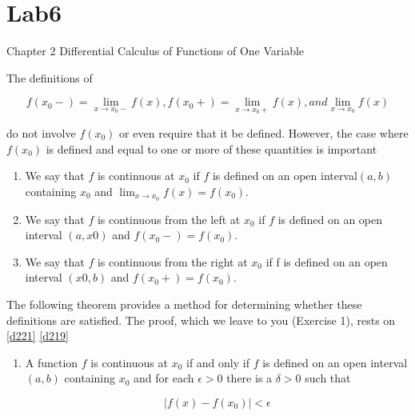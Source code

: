 \chapter{Lab6}
\begin{flushleft}

Chapter 2 Differential Calculus of Functions of One Variable

The definitions of

$$
f(x_0-) =  \lim_{x \rightarrow x_0-} f(x), f(x_0+) =  \lim_{x \rightarrow x_0+} f(x), and  \lim_{x \rightarrow x_0} f(x)
$$


do not involve $f(x_0)$ or even require that it be defined. However, the case where $f(x_0)$ is
defined and equal to one or more of these quantities is important

\begin{definition}\label{d219}


\begin{enumerate}[label=\alph*.]
\item  We say that $f$ is continuous at $x_0$ if $f$ is defined on an open interval$(a, b)$ containing
$x_0$ and $ \lim_{x \rightarrow x_0} f(x) = f(x_0).$

\item  We say that $f$ is continuous from the left at $x_0$ if $f$ is defined on an open interval
$(a, x0)$ and $f(x_0-) = f(x_0).$
\item  We say that $f$ is continuous from the right at $x_0$ if f is defined on an open interval
$(x0, b)$ and $f(x_0+) = f(x_0).$
\end{enumerate}
\end{definition}



The following theorem provides a method for determining whether these definitions are
satisfied. The proof, which we leave to you (Exercise 1), rests on \ref{d221} \ref{d219}


\begin{theorem}\label{t219}
\begin{enumerate}[label=\alph*.]
\item  A function $f$ is continuous at $x_0$ if and only if $f$ is defined on an open interval $(a, b)$
containing $x_0$ and for each $ \epsilon  > 0$ there is a $\delta  > 0$ such that




\begin{equation}\label{formula1}
| f(x) - f (x_0) | < \epsilon
\end{equation}


\end{enumerate}
\end{theorem}
\end{flushleft}
